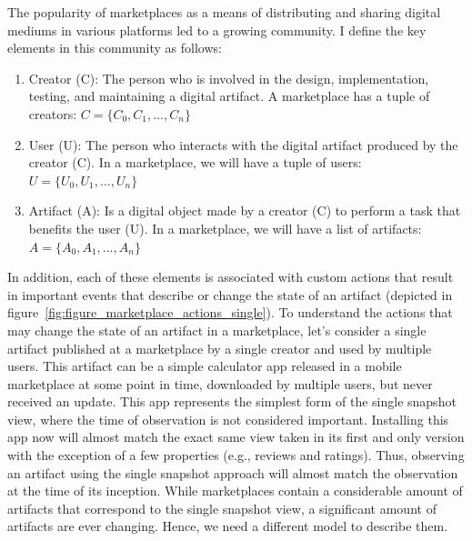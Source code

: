 The popularity of marketplaces as a means of distributing and sharing digital mediums in various platforms led to a growing community.
I define the key elements in this community as follows:
\begin{enumerate}
\item Creator (C): The person who is involved in the design, implementation, testing, and maintaining a digital artifact. A marketplace has a tuple of creators: $C=\{C_0, C_1,..., C_n\}$
\item User (U): The person who interacts with the digital artifact produced by the creator (C). In a marketplace, we will have a tuple of users: $U=\{U_0, U_1,..., U_n\}$
\item Artifact (A): Is a digital object made by a creator (C) to perform a task that benefits the user (U). In a marketplace, we will have a list of artifacts: $A=\{A_0, A_1,..., A_n\}$
\end{enumerate}
In addition, each of these elements is associated with custom actions that result in important events that describe or change the state of an artifact (depicted in figure~\ref{fig:figure_marketplace_actions_single}).
To understand the actions that may change the state of an artifact in a marketplace, let's consider a single artifact published at a marketplace by a single creator and used by multiple users.
This artifact can be a simple calculator app released in a mobile marketplace at some point in time, downloaded by multiple users, but never received an update.
This app represents the simplest form of the single snapshot view, where the time of observation is not considered important.
Installing this app now will almost match the exact same view taken in its first and only version with the exception of a few properties (e.g., reviews and ratings).
Thus, observing an artifact using the single snapshot approach will almost match the observation at the time of its inception.
While marketplaces contain a considerable amount of artifacts that correspond to the single snapshot view, a significant amount of artifacts are ever changing.
Hence, we need a different model to describe them.

